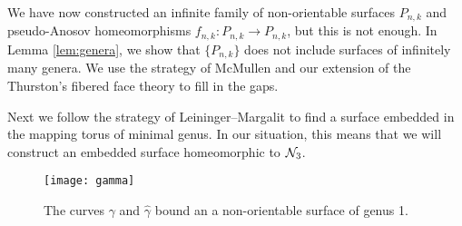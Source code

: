 
We have now constructed an infinite family of non-orientable surfaces $P_{n,k}$ and pseudo-Anosov homeomorphisms $f_{n,k}:P_{n,k}\to P_{n,k}$, but this is not
enough. In Lemma \ref{lem:genera}, we show that $\{P_{n,k}\}$ does not include surfaces of infinitely many genera. We use the strategy of McMullen \cite{mcmullen2000polynomial} and our extension of the Thurston's
fibered face theory to fill in the gaps. 

Next we follow the strategy of Leininger--Margalit \cite{leininger2013number} to find a surface embedded in the mapping torus of minimal genus.  In our situation, this means that we will construct an embedded surface homeomorphic to $\mathcal{N}_3$.


\begin{figure}[t]
    \centering
    \texttt{[image: gamma]}
    \caption{The curves $\gamma$ and $\widehat{\gamma}$ bound an a non-orientable surface of genus 1.}
    \label{fig:gammacurves}
\end{figure}

